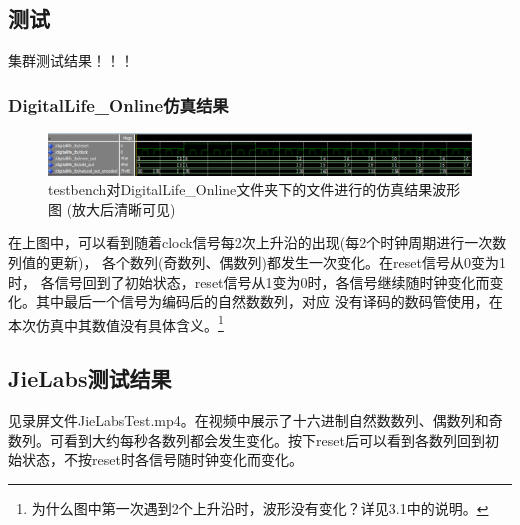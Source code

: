 \documentclass[UTF8]{article}
\begin{document}
\subsection{测试}
集群测试结果！！！


\subsubsection{DigitalLife\_Online仿真结果}
\begin{figure}[h]
    \centering
    \includegraphics[width=\textwidth]{DL_Online_testbench.png}
    \caption{testbench对DigitalLife\_Online文件夹下的文件进行的仿真结果波形图 (放大后清晰可见)}
\end{figure}

\qquad 在上图中，可以看到随着clock信号每2次上升沿的出现(每2个时钟周期进行一次数列值的更新)，
各个数列(奇数列、偶数列)都发生一次变化。在reset信号从0变为1时，
各信号回到了初始状态，reset信号从1变为0时，各信号继续随时钟变化而变化。其中最后一个信号为编码后的自然数数列，对应
没有译码的数码管使用，在本次仿真中其数值没有具体含义。\footnote{为什么图中第一次遇到2个上升沿时，波形没有变化？详见3.1中的说明。}


\subsection{JieLabs测试结果}
\qquad 见录屏文件JieLabsTest.mp4。在视频中展示了十六进制自然数数列、偶数列和奇数列。可看到大约每秒各数列都会发生变化。按下reset后可以看到各数列回到初始状态，不按reset时各信号随时钟变化而变化。



\end{document}
